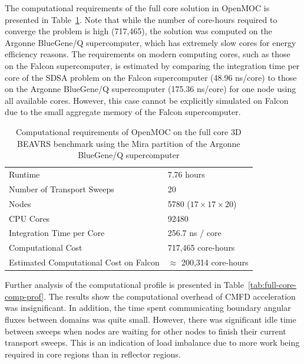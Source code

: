 \documentclass[12pt,twoside]{mitthesis-exec}
\begin{document}
The computational requirements of the full core solution in OpenMOC is presented in Table~\ref{tab:full-core-comp-req}. Note that while the number of core-hours required to converge the problem is high (717,465), the solution was computed on the Argonne BlueGene/Q supercomputer, which has extremely slow cores for energy efficiency reasons. The requirements on modern computing cores, such as those on the Falcon supercomputer, is estimated by comparing the integration time per core of the SDSA problem on the Falcon supercomputer (48.96 ns/core) to those on the Argonne BlueGene/Q supercomputer (175.36 ns/core) for one node using all available cores. However, this case cannot be explicitly simulated on Falcon due to the small aggregate memory of the Falcon supercomputer.

\begin{table}[ht]
	\centering
	\caption{Computational requirements of OpenMOC on the full core 3D BEAVRS benchmark using the Mira partition of the Argonne BlueGene/Q supercomputer}
	\medskip
	\begin{tabular}{l|l}
		\hline
		Runtime & 7.76 hours \\
		Number of Transport Sweeps & 20 \\
		Nodes & 5780 ($17 \times 17 \times 20$) \\
		CPU Cores & 92480 \\
		Integration Time per Core & 256.7 ns / core \\
		Computational Cost & 717,465 core-hours \\
		Estimated Computational Cost on Falcon & $\approx$ 200,314 core-hours \\
		\hline
	\end{tabular}
	\label{tab:full-core-comp-req}
\end{table}

Further analysis of the computational profile is presented in Table~\ref{tab:full-core-comp-prof}. The results show the computational overhead of CMFD acceleration was insignificant. In addition, the time spent communicating boundary angular fluxes between domains was quite small. However, there was significant idle time between sweeps when nodes are waiting for other nodes to finish their current transport sweeps. This is an indication of load imbalance due to more work being required in core regions than in reflector regions.
\end{document}
